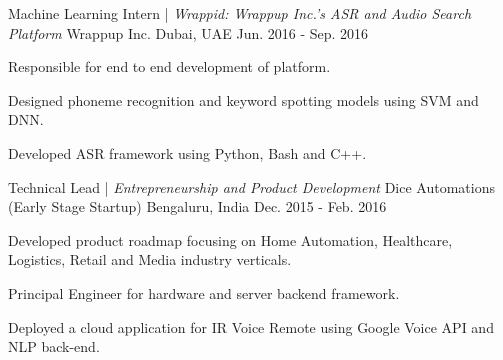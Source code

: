 \vspace{-1em}
\begin{cventries}

	\cventry
	{Machine Learning Intern | \textit{Wrappid: Wrappup Inc.'s ASR and Audio Search Platform}}
	{Wrappup Inc.}
	{Dubai, UAE}
	{Jun. 2016 - Sep. 2016}
	{ \begin{cvitems}
		\item {Responsible for end to end development of platform.}
		\item {Designed phoneme recognition and keyword spotting models using SVM and DNN.}
		\item {Developed ASR framework using Python, Bash and C++.}		
	  \end{cvitems}
	}

\cventry
  	{Technical Lead | \textit{Entrepreneurship and Product Development}}
  	{Dice Automations (Early Stage Startup)}
  	{Bengaluru, India}
  	{Dec. 2015 - Feb. 2016}
  	{ \begin{cvitems}
  		\item {Developed product roadmap focusing on Home Automation, Healthcare, Logistics, Retail and Media industry verticals.}
		\item {Principal Engineer for hardware and server backend framework.}
		\item {Deployed a cloud application for IR Voice Remote using Google Voice API and NLP back-end.}
		\end{cvitems}  	
  	}
  	  

\end{cventries}
